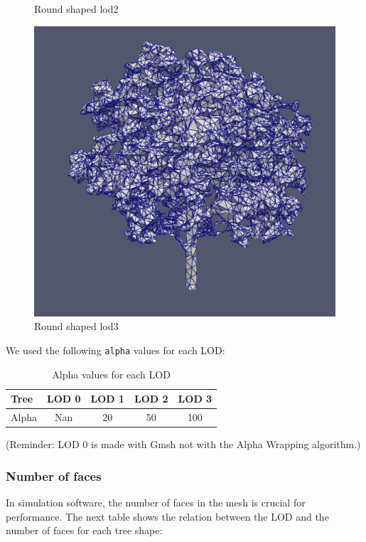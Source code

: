\documentclass[12pt]{article}
\begin{document}
\begin{figure}[H]
\begin{minipage}{0.30\textwidth}
        \caption{Round shaped lod2}
    \end{minipage}
    \begin{minipage}{0.30\textwidth}
        \centering
        \includegraphics[width=1\textwidth]{images/tree-round_lod3.png}
        \caption{Round shaped lod3}
    \end{minipage}
\end{figure}


We used the following \texttt{alpha} values for each LOD:
\begin{table}[H]
    \centering
    \begin{tabular}{|l|c|c|c|c|}
    \hline
    Tree & LOD 0 & LOD 1 & LOD 2 & LOD 3 \\
    \hline
    Alpha & Nan & 20 & 50 & 100 \\
    \hline
    \end{tabular}
    \caption{Alpha values for each LOD}
    \label{tab:my_label}
\end{table}

(Reminder: LOD 0 is made with Gmsh not with the Alpha Wrapping algorithm.)

\subsubsection{Number of faces}
In simulation software, the number of faces in the mesh is crucial for
performance. The next table shows the relation between the LOD and the number of
 faces for each tree shape:
\end{document}
